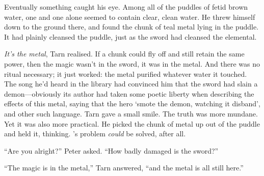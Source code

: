 Eventually something caught his eye.  Among all of the puddles of fetid brown water, one and one alone seemed to contain clear, clean water.  He threw himself down to the ground there, and found the chunk of teal metal lying in the puddle.  It had plainly cleansed the puddle, just as the sword had cleansed the elemental.

\emph{It's the metal}, Tarn realised.  If a chunk could fly off and still retain the same power, then the magic wasn't in the sword, it was in the metal.  And there was no ritual necessary; it just worked: the metal purified whatever water it touched.  The song he'd heard in the library had convinced him that the sword had slain a demon---obviously its author had taken some poetic liberty when describing the effects of this metal, saying that the hero `smote the demon, watching it disband', and other such language.  Tarn gave a small smile.  The truth was more mundane.  Yet it was also more practical.  He picked the chunk of metal up out of the puddle and held it, thinking.  \korbarthrond's problem \emph{could} be solved, after all.

``Are you alright?'' Peter asked.  ``How badly damaged is the sword?''

``The magic is in the metal,'' Tarn answered, ``and the metal is all still here.''